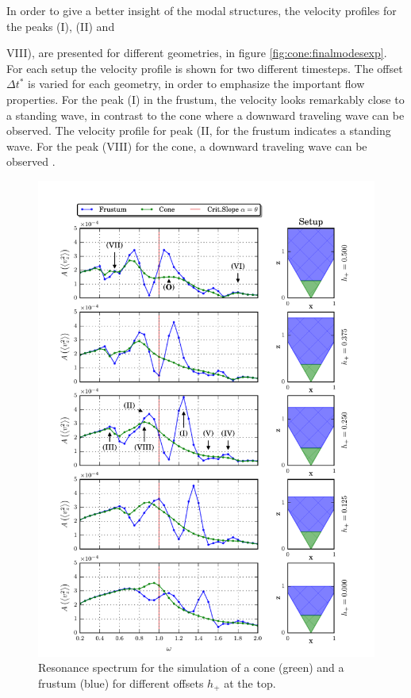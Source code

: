 In order to give a better insight of the modal structures, the velocity profiles for the peaks (\RN{1}), (\RN{2}) and {\RN{8}),
are presented for different geometries, in figure \ref{fig:cone:finalmodesexp}.
For each setup the velocity profile is shown for two different timesteps. The offset $\Delta t^*$ is varied  for each geometry, in order to emphasize
the important flow properties.
For the peak (\RN{1}) in the frustum, the velocity looks remarkably close to a standing wave,
in contrast to the cone where a downward traveling wave can be observed.
The velocity profile for peak (\RN{2}, for the frustum indicates a standing wave.
For the peak (\RN{8}) for the cone, a downward traveling wave can be observed .


\begin{figure}[!pt]
  \centering
  \includegraphics{gfx/cone/final/transition.pdf}
  \caption{
      \label{fig:cone:finaltransition}
    Resonance spectrum for the simulation of a cone (green) and a frustum (blue) for different offsets $h_+$ at the
    top.
    }
\end{figure}
\clearpage

}
